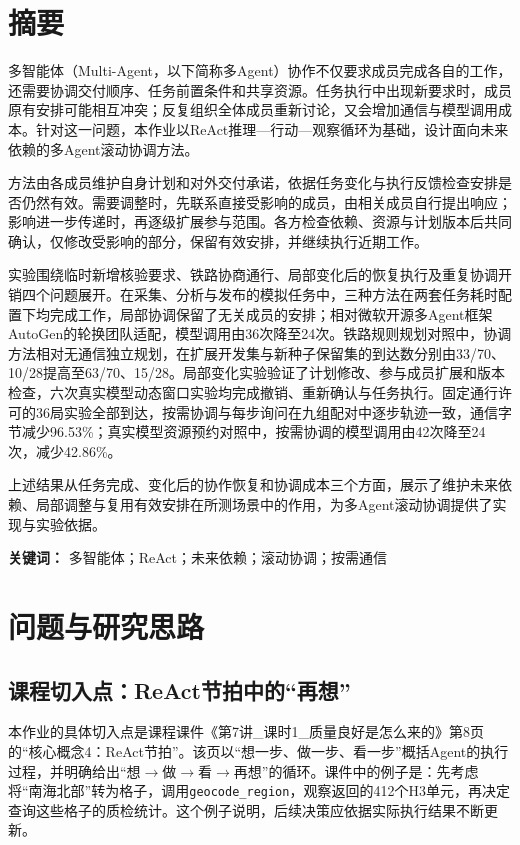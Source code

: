\hypertarget{ux6458ux8981}{%
\chapter*{摘要}\label{ux6458ux8981}}

多智能体（Multi-Agent，以下简称多Agent）协作不仅要求成员完成各自的工作，还需要协调交付顺序、任务前置条件和共享资源。任务执行中出现新要求时，成员原有安排可能相互冲突；反复组织全体成员重新讨论，又会增加通信与模型调用成本。针对这一问题，本作业以ReAct推理—行动—观察循环为基础，设计面向未来依赖的多Agent滚动协调方法。

方法由各成员维护自身计划和对外交付承诺，依据任务变化与执行反馈检查安排是否仍然有效。需要调整时，先联系直接受影响的成员，由相关成员自行提出响应；影响进一步传递时，再逐级扩展参与范围。各方检查依赖、资源与计划版本后共同确认，仅修改受影响的部分，保留有效安排，并继续执行近期工作。

实验围绕临时新增核验要求、铁路协商通行、局部变化后的恢复执行及重复协调开销四个问题展开。在采集、分析与发布的模拟任务中，三种方法在两套任务耗时配置下均完成工作，局部协调保留了无关成员的安排；相对微软开源多Agent框架AutoGen的轮换团队适配，模型调用由36次降至24次。铁路规则规划对照中，协调方法相对无通信独立规划，在扩展开发集与新种子保留集的到达数分别由33/70、10/28提高至63/70、15/28。局部变化实验验证了计划修改、参与成员扩展和版本检查，六次真实模型动态窗口实验均完成撤销、重新确认与任务执行。固定通行许可的36局实验全部到达，按需协调与每步询问在九组配对中逐步轨迹一致，通信字节减少96.53\%；真实模型资源预约对照中，按需协调的模型调用由42次降至24次，减少42.86\%。

上述结果从任务完成、变化后的协作恢复和协调成本三个方面，展示了维护未来依赖、局部调整与复用有效安排在所测场景中的作用，为多Agent滚动协调提供了实现与实验依据。

\textbf{关键词：} 多智能体；ReAct；未来依赖；滚动协调；按需通信

\hypertarget{ux95eeux9898ux4e0eux7814ux7a76ux601dux8def}{%
\chapter{问题与研究思路}\label{ux95eeux9898ux4e0eux7814ux7a76ux601dux8def}}

\section{课程切入点：ReAct节拍中的“再想”}

本作业的具体切入点是课程课件《第7讲\_课时1\_质量良好是怎么来的》第8页的“核心概念4：ReAct节拍”\cite{course}。该页以“想一步、做一步、看一步”概括Agent的执行过程，并明确给出“想$\rightarrow$做$\rightarrow$看$\rightarrow$再想”的循环。课件中的例子是：先考虑将“南海北部”转为格子，调用\texttt{geocode\_region}，观察返回的412个H3单元，再决定查询这些格子的质检统计。这个例子说明，后续决策应依据实际执行结果不断更新。

